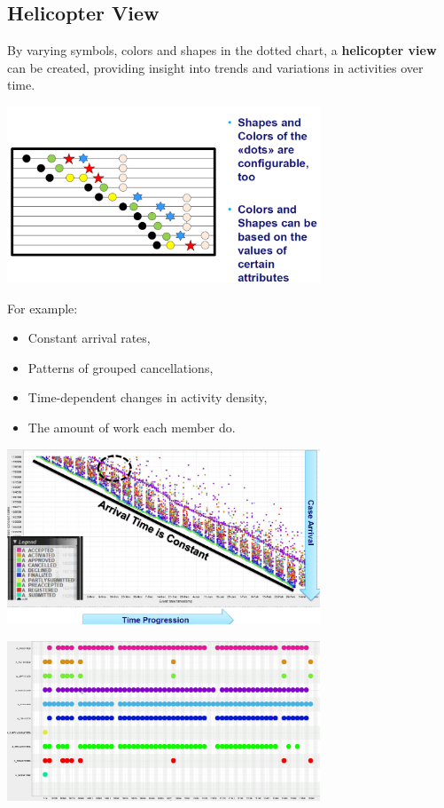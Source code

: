 \subsection{Helicopter View}
By varying symbols, colors and shapes in the dotted chart, a \textbf{helicopter view} can be created, providing insight into trends and variations in activities over time.
\begin{center}
    \includegraphics[width=0.7\textwidth]{capitolo 8/slide10.png}
\end{center}
For example:
\begin{itemize}
    \item Constant arrival rates,
    \item Patterns of grouped cancellations,
    \item Time-dependent changes in activity density,
    \item The amount of work each member do.
\end{itemize}
\begin{center}
    \includegraphics[width=0.7\textwidth]{capitolo 8/slide11.png}
\end{center}

\begin{center}
    \includegraphics[width=0.7\textwidth]{capitolo 8/slide 14.png}
\end{center}

